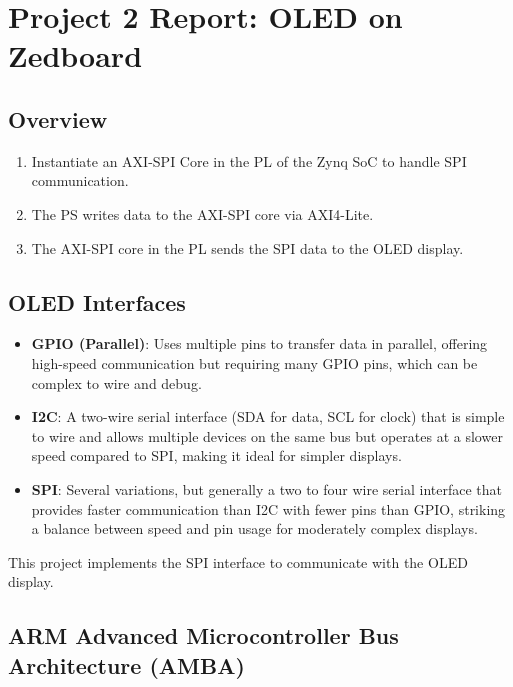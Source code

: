 \hypertarget{project-2-report-oled-on-zedboard}{%
\section{Project 2 Report: OLED on
Zedboard}\label{project-2-report-oled-on-zedboard}}

\hypertarget{overview}{%
\subsection{Overview}\label{overview}}

\begin{enumerate}
\def\labelenumi{\arabic{enumi}.}
\tightlist
\item
  Instantiate an AXI-SPI Core in the PL of the Zynq SoC to handle SPI
  communication.
\item
  The PS writes data to the AXI-SPI core via AXI4-Lite.
\item
  The AXI-SPI core in the PL sends the SPI data to the OLED display.
\end{enumerate}

\hypertarget{oled-interfaces}{%
\subsection{OLED Interfaces}\label{oled-interfaces}}

\begin{itemize}
\item
  \textbf{GPIO (Parallel)}: Uses multiple pins to transfer data in
  parallel, offering high-speed communication but requiring many GPIO
  pins, which can be complex to wire and debug.
\item
  \textbf{I2C}: A two-wire serial interface (SDA for data, SCL for
  clock) that is simple to wire and allows multiple devices on the same
  bus but operates at a slower speed compared to SPI, making it ideal
  for simpler displays.
\item
  \textbf{SPI}: Several variations, but generally a two to four wire
  serial interface that provides faster communication than I2C with
  fewer pins than GPIO, striking a balance between speed and pin usage
  for moderately complex displays.
\end{itemize}

This project implements the SPI interface to communicate with the OLED
display.

\hypertarget{arm-advanced-microcontroller-bus-architecture-amba}{%
\subsection{ARM Advanced Microcontroller Bus Architecture
(AMBA)}\label{arm-advanced-microcontroller-bus-architecture-amba}}


